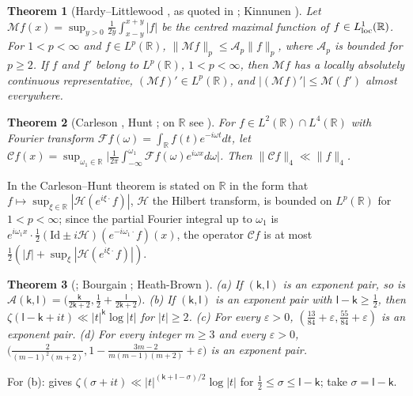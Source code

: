 \documentclass[preprint,12pt]{elsarticle}
\numberwithin{equation}{section}
\theoremstyle{plain}
\newtheorem{theorem}{Theorem}[section]
\theoremstyle{definition}
\theoremstyle{remark}
\newcommand{\R}{\mathbb R}
\begin{document}
\begin{theorem}[Hardy--Littlewood {\cite[Thm.~I.1]{Stein1970}}, as quoted in {\cite[(1.2)]{Kinnunen1997}}; Kinnunen {\cite[Thm.~1.4]{Kinnunen1997}}]\label{thm:known_maximal}
Let $\mathcal Mf(x)=\sup_{y>0}\frac1{2y}\int_{x-y}^{x+y}|f|$ be the centred maximal function of $f\in L^1_{\rm loc}(\R)$. For $1<p<\infty$ and $f\in L^p(\R)$, $\|\mathcal Mf\|_p\le\mathcal A_p\|f\|_p$, where $\mathcal A_p$ is bounded for $p\ge2$. If $f$ and $f'$ belong to $L^p(\R)$, $1<p<\infty$, then $\mathcal Mf$ has a locally absolutely continuous representative, $(\mathcal Mf)'\in L^p(\R)$, and $|(\mathcal Mf)'|\le\mathcal M(f')$ almost everywhere.
\end{theorem}

\begin{theorem}[Carleson {\cite{Carleson1966}}, Hunt {\cite{Hunt1968}}; on $\R$ see {\cite[(1.1) and p.~1]{DiPlinioLerner2014}}]\label{thm:known_carleson}
For $f\in L^2(\R)\cap L^4(\R)$ with Fourier transform $\mathcal Ff(\omega)=\int_\R f(t)e^{-i\omega t}dt$, let $\mathcal Cf(x)=\sup_{\omega_1\in\R}\bigl|\frac1{2\pi}\int_{-\infty}^{\omega_1}\mathcal Ff(\omega)e^{i\omega x}d\omega\bigr|$. Then $\|\mathcal Cf\|_4\ll\|f\|_4$.
\end{theorem}
In \cite[p.~1]{DiPlinioLerner2014} the Carleson--Hunt theorem is stated on $\R$ in the form that $f\mapsto\sup_{\xi\in\R}|\mathcal H(e^{i\xi\cdot}f)|$, $\mathcal H$ the Hilbert transform, is bounded on $L^p(\R)$ for $1<p<\infty$; since the partial Fourier integral up to $\omega_1$ is $e^{i\omega_1x}\cdot\frac12(\mathrm{Id}\pm i\mathcal H)(e^{-i\omega_1\cdot}f)(x)$, the operator $\mathcal Cf$ is at most $\frac12(|f|+\sup_\xi|\mathcal H(e^{i\xi\cdot}f)|)$.

\begin{theorem}[{\cite[Lemma~2.8 and (7.57)]{Ivic1985}}; Bourgain {\cite[\S5, Thm.~6]{Bourgain2017}}; Heath-Brown {\cite[Thm.~2]{HeathBrown2017}}]\label{thm:known_exponents}
(a) If $(\mathsf k,\mathsf l)$ is an exponent pair, so is $\mathscr A(\mathsf k,\mathsf l)=\bigl(\frac{\mathsf k}{2\mathsf k+2},\frac12+\frac{\mathsf l}{2\mathsf k+2}\bigr)$. (b) If $(\mathsf k,\mathsf l)$ is an exponent pair with $\mathsf l-\mathsf k\ge\frac12$, then $\zeta(\mathsf l-\mathsf k+it)\ll|t|^{\mathsf k}\log|t|$ for $|t|\ge2$. (c) For every $\varepsilon>0$, $(\frac{13}{84}+\varepsilon,\frac{55}{84}+\varepsilon)$ is an exponent pair. (d) For every integer $m\ge3$ and every $\varepsilon>0$, $\bigl(\frac2{(m-1)^2(m+2)},1-\frac{3m-2}{m(m-1)(m+2)}+\varepsilon\bigr)$ is an exponent pair.
\end{theorem}
For (b): \cite[(7.57)]{Ivic1985} gives $\zeta(\sigma+it)\ll|t|^{(\mathsf k+\mathsf l-\sigma)/2}\log|t|$ for $\frac12\le\sigma\le\mathsf l-\mathsf k$; take $\sigma=\mathsf l-\mathsf k$.
\end{document}
